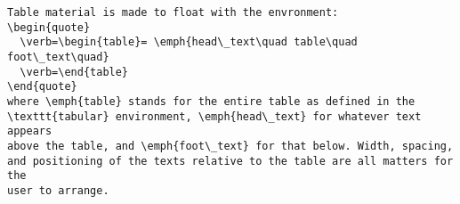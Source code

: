 \documentclass{article}
\begin{document}
\begin{verbatim}
Table material is made to float with the envronment:
\begin{quote}
  \verb=\begin{table}= \emph{head\_text\quad table\quad foot\_text\quad}
  \verb=\end{table}
\end{quote}
where \emph{table} stands for the entire table as defined in the 
\texttt{tabular} environment, \emph{head\_text} for whatever text appears
above the table, and \emph{foot\_text} for that below. Width, spacing,
and positioning of the texts relative to the table are all matters for the
user to arrange.
\end{verbatim}
\end{document}
